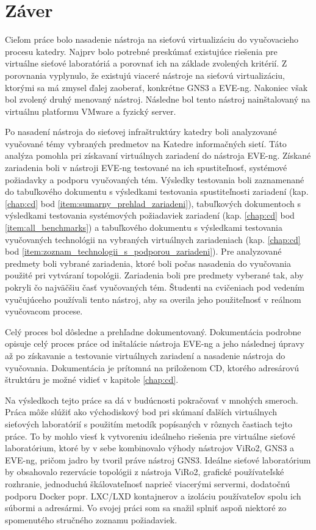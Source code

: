\chapter{Záver}

Cieľom práce bolo nasadenie nástroja na sieťovú virtualizáciu do vyučovacieho procesu katedry. Najprv bolo potrebné preskúmať existujúce riešenia pre virtuálne sieťové laboratóriá a porovnať ich na základe zvolených kritérií. Z porovnania vyplynulo, že existujú viaceré nástroje na sieťovú virtualizáciu, ktorými sa má zmysel ďalej zaoberať, konkrétne GNS3 a EVE-ng. Nakoniec však bol zvolený druhý menovaný nástroj. Následne bol tento nástroj nainštalovaný na virtuálnu platformu VMware a fyzický server.

Po nasadení nástroja do sieťovej infraštruktúry katedry boli analyzované vyučované témy vybraných predmetov na Katedre informačných sietí. Táto analýza pomohla pri získavaní virtuálnych zariadení do nástroja EVE-ng. Získané zariadenia boli v nástroji EVE-ng testované na ich spustiteľnosť, systémové požiadavky a podporu vyučovaných tém. Výsledky testovania boli zaznamenané do tabuľkového dokumentu s výsledkami testovania spustiteľnosti zariadení (kap. \ref{chap:cd} bod \ref{item:sumarny_prehlad_zariadeni}), tabuľkových dokumentoch s výsledkami testovania systémových požiadaviek zariadení (kap. \ref{chap:cd} bod \ref{item:all_benchmarks}) a tabuľkového dokumentu s výsledkami testovania vyučovaných technológii na vybraných virtuálnych zariadeniach (kap. \ref{chap:cd} bod \ref{item:zoznam_technologii_s_podporou_zariadeni}). Pre analyzované predmety boli vybrané zariadenia, ktoré boli počas nasadenia do vyučovania použité pri vytváraní topológii. Zariadenia boli pre predmety vyberané tak, aby pokryli čo najväčšiu časť vyučovaných tém. Študenti na cvičeniach pod vedením vyučujúceho používali tento nástroj, aby sa overila jeho použiteľnosť v reálnom vyučovacom procese.

Celý proces bol dôsledne a prehľadne dokumentovaný. Dokumentácia podrobne opisuje celý proces práce od inštalácie nástroja EVE-ng a jeho následnej úpravy až po získavanie a testovanie virtuálnych zariadení a nasadenie nástroja do vyučovania. Dokumentácia je prítomná na priloženom CD, ktorého adresárovú štruktúru je možné vidieť v kapitole \ref{chap:cd}.

Na výsledkoch tejto práce sa dá v budúcnosti pokračovať v mnohých smeroch. Práca môže slúžiť ako východiskový bod pri skúmaní ďalších virtuálnych sieťových laboratórií s použitím metodík popísaných v rôznych častiach tejto práce. To by mohlo viesť k vytvoreniu ideálneho riešenia pre virtuálne sieťové laboratórium, ktoré by v sebe kombinovalo výhody nástrojov ViRo2, GNS3 a EVE-ng, pričom jadro by tvoril práve nástroj GNS3. Ideálne sieťové laboratórium by obsahovalo rezervácie topológii z nástroja ViRo2, grafické používateľské rozhranie, jednoduchú škálovateľnosť naprieč viacerými servermi, dodatočnú podporu Docker popr. LXC/LXD kontajnerov a izoláciu používateľov spolu ich súbormi a adresármi. Vo svojej práci som sa snažil splniť aspoň niektoré zo spomenutého stručného zoznamu požiadaviek.

